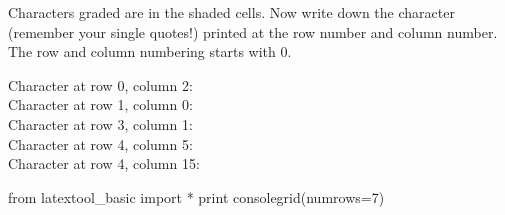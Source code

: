 Characters graded are in the shaded cells.
Now write down the character (remember your single quotes!)
printed at the row number and column number.
The row and column numbering starts with 0.

\nextq Character at row 0, column 2: \answerbox{ }\\
\nextq Character at row 1, column 0: \answerbox{ }\\
\nextq Character at row 3, column 1: \answerbox{ }\\
\nextq Character at row 4, column 5: \answerbox{ }\\
\nextq Character at row 4, column 15: \answerbox{ }\\

\begin{python}
from latextool_basic import *
print consolegrid(numrows=7)
\end{python}

\newpage


